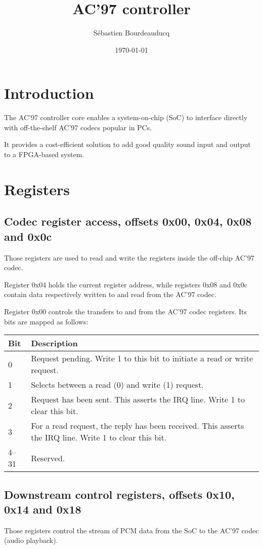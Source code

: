 \documentclass[a4paper,11pt]{article}
\title{AC'97 controller}
\author{S\'ebastien Bourdeauducq}
\date{\today}
\begin{document}
\setlength{\parindent}{0pt}
\setlength{\parskip}{5pt}
\maketitle{}
\section{Introduction}
The AC'97 controller core enables a system-on-chip (SoC) to interface directly with off-the-shelf AC'97 codecs popular in PCs.

It provides a cost-efficient solution to add good quality sound input and output to a FPGA-based system.

\section{Registers}
\subsection{Codec register access, offsets 0x00, 0x04, 0x08 and 0x0c}
Those registers are used to read and write the registers inside the off-chip AC'97 codec.

Register 0x04 holds the current register address, while registers 0x08 and 0x0c contain data respectively written to and read from the AC'97 codec.

Register 0x00 controls the transfers to and from the AC'97 codec registers. Its bits are mapped as follows:

\begin{tabularx}{\textwidth}{|l|X|}
\hline
\textbf{Bit} & \textbf{Description} \\
\hline
0 & Request pending. Write 1 to this bit to initiate a read or write request. \\
\hline
1 & Selects between a read (0) and write (1) request. \\
\hline
2 & Request has been sent. This asserts the IRQ line. Write 1 to clear this bit. \\
\hline
3 & For a read request, the reply has been received. This asserts the IRQ line. Write 1 to clear this bit. \\
\hline
4--31 & Reserved. \\
\hline
\end{tabularx}

\subsection{Downstream control registers, offsets 0x10, 0x14 and 0x18}
Those registers control the stream of PCM data from the SoC to the AC'97 codec (audio playback).
\end{document}
